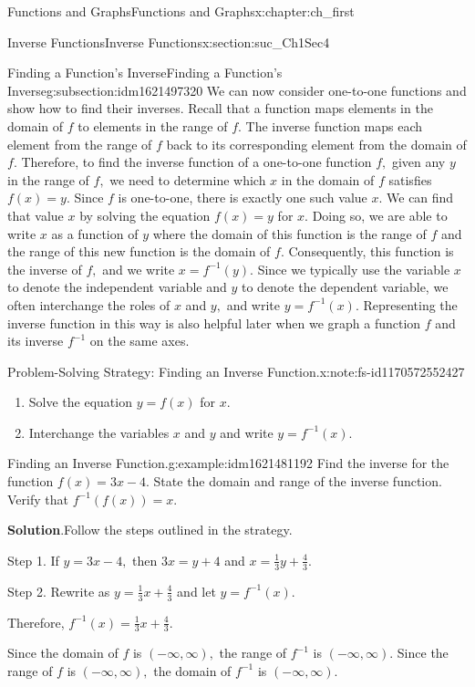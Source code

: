 \documentclass[oneside,10pt,]{book}
\newcommand{\blocktitlefont}{\relax}
\numberwithin{equation}{section}
\begin{document}
\begin{chapterptx}{Functions and Graphs}{}{Functions and Graphs}{}{}{x:chapter:ch_first}
\begin{sectionptx}{Inverse Functions}{}{Inverse Functions}{}{}{x:section:suc_Ch1Sec4}
\begin{subsectionptx}{Finding a Function’s Inverse}{}{Finding a Function’s Inverse}{}{}{g:subsection:idm1621497320}
We can now consider one-to-one functions and show how to find their inverses. Recall that a function maps elements in the domain of \(f\) to elements in the range of \(f.\) The inverse function maps each element from the range of \(f\) back to its corresponding element from the domain of \(f.\) Therefore, to find the inverse function of a one-to-one function \(f,\) given any \(y\) in the range of \(f,\) we need to determine which \(x\) in the domain of \(f\) satisfies \(f(x)=y.\) Since \(f\) is one-to-one, there is exactly one such value \(x.\) We can find that value \(x\) by solving the equation \(f(x)=y\) for \(x.\) Doing so, we are able to write \(x\) as a function of \(y\) where the domain of this function is the range of \(f\) and the range of this new function is the domain of \(f.\) Consequently, this function is the inverse of \(f,\) and we write \(x=f^{-1} (y).\) Since we typically use the variable \(x\) to denote the independent variable and \(y\) to denote the dependent variable, we often interchange the roles of \(x\) and \(y,\) and write \(y=f^{-1} (x).\) Representing the inverse function in this way is also helpful later when we graph a function \(f\) and its inverse \(f^{-1} \) on the same axes.%
\begin{note}{Problem-Solving Strategy: Finding an Inverse Function.}{x:note:fs-id1170572552427}%
%
\begin{enumerate}
\item{}Solve the equation \(y=f(x)\) for \(x.\)%
\item{}Interchange the variables \(x\) and \(y\) and write \(y=f^{-1} (x).\)%
\end{enumerate}
\end{note}
\begin{example}{Finding an Inverse Function.}{g:example:idm1621481192}%
Find the inverse for the function \(f(x)=3x-4.\) State the domain and range of the inverse function. Verify that \(f^{-1} (f(x))=x.\)%
\par\smallskip%
\noindent\textbf{\blocktitlefont Solution}.\hypertarget{g:solution:idm1621478760}{}\quad{}Follow the steps outlined in the strategy.%
\par
Step 1. If \(y=3x-4,\) then \(3x=y+4\) and \(x= \frac{1}{3}y+ \frac{4}{3}.\)%
\par
Step 2. Rewrite as \(y=\frac{1}{3}x+ \frac{4}{3}\) and let \(y=f^{-1} (x).\)%
\par
Therefore, \(f^{-1} (x)= \frac{1}{3}x+ \frac{4}{3}.\)%
\par
Since the domain of \(f\) is \((-\infty ,\infty ),\) the range of \(f^{-1} \) is \((-\infty ,\infty ).\) Since the range of \(f\) is \((-\infty ,\infty ),\) the domain of \(f^{-1} \) is \((-\infty ,\infty ).\)%

\end{example}
\end{subsectionptx}
\end{sectionptx}
\end{chapterptx}
\end{document}
